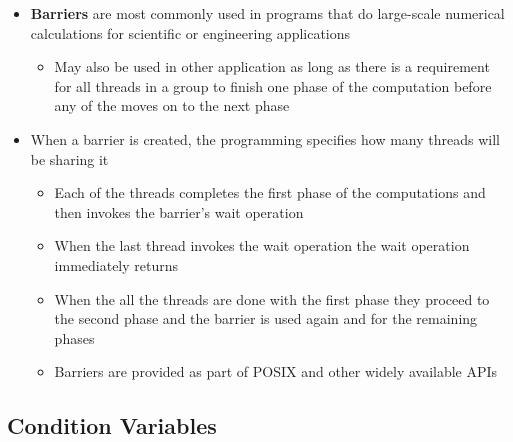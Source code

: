 \documentclass[11pt]{article}
\providecommand{\tightlist}{%
      \setlength{\itemsep}{0pt}\setlength{\parskip}{0pt}}
\begin{document}
\begin{itemize}
\tightlist
\item
  \textbf{Barriers} are most commonly used in programs that do
  large-scale numerical calculations for scientific or engineering
  applications

  \begin{itemize}
  \tightlist
  \item
    May also be used in other application as long as there is a
    requirement for all threads in a group to finish one phase of the
    computation before any of the moves on to the next phase
  \end{itemize}
\item
  When a barrier is created, the programming specifies how many threads
  will be sharing it

  \begin{itemize}
  \tightlist
  \item
    Each of the threads completes the first phase of the computations
    and then invokes the barrier's wait operation
  \item
    When the last thread invokes the wait operation the wait operation
    immediately returns
  \item
    When the all the threads are done with the first phase they proceed
    to the second phase and the barrier is used again and for the
    remaining phases
  \item
    Barriers are provided as part of POSIX and other widely available
    APIs
  \end{itemize}
\end{itemize}

    \subsection{Condition Variables}\label{condition-variables}
\end{document}
